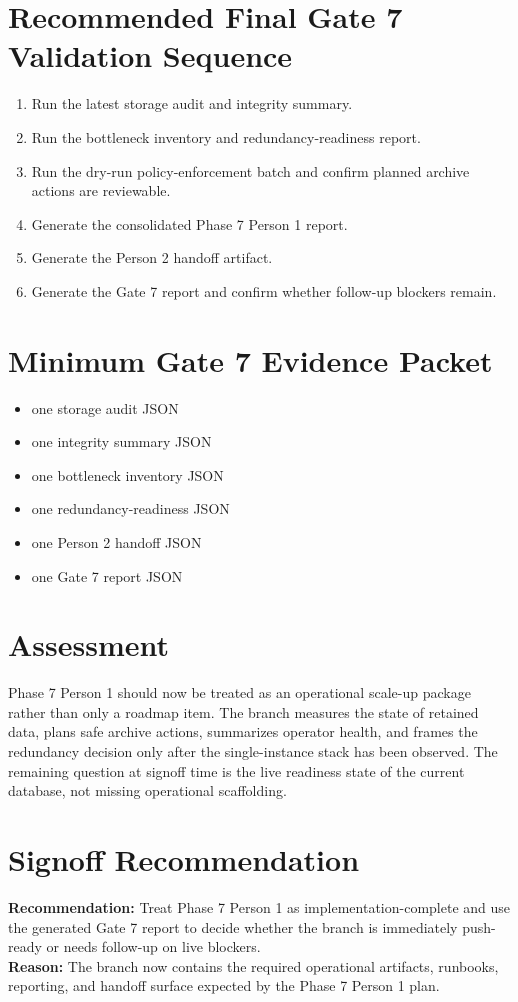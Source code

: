 \documentclass{article}
\begin{document}
\section*{Recommended Final Gate 7 Validation Sequence}
\begin{enumerate}
\item Run the latest storage audit and integrity summary.
\item Run the bottleneck inventory and redundancy-readiness report.
\item Run the dry-run policy-enforcement batch and confirm planned archive actions are reviewable.
\item Generate the consolidated Phase 7 Person 1 report.
\item Generate the Person 2 handoff artifact.
\item Generate the Gate 7 report and confirm whether follow-up blockers remain.
\end{enumerate}

\section*{Minimum Gate 7 Evidence Packet}
\begin{itemize}
\item one storage audit JSON
\item one integrity summary JSON
\item one bottleneck inventory JSON
\item one redundancy-readiness JSON
\item one Person 2 handoff JSON
\item one Gate 7 report JSON
\end{itemize}

\section*{Assessment}
Phase 7 Person 1 should now be treated as an operational scale-up package rather than only a roadmap item. The branch measures the state of retained data, plans safe archive actions, summarizes operator health, and frames the redundancy decision only after the single-instance stack has been observed. The remaining question at signoff time is the live readiness state of the current database, not missing operational scaffolding.

\section*{Signoff Recommendation}
\textbf{Recommendation:} Treat Phase 7 Person 1 as implementation-complete and use the generated Gate 7 report to decide whether the branch is immediately push-ready or needs follow-up on live blockers.\\
\textbf{Reason:} The branch now contains the required operational artifacts, runbooks, reporting, and handoff surface expected by the Phase 7 Person 1 plan.
\end{document}

